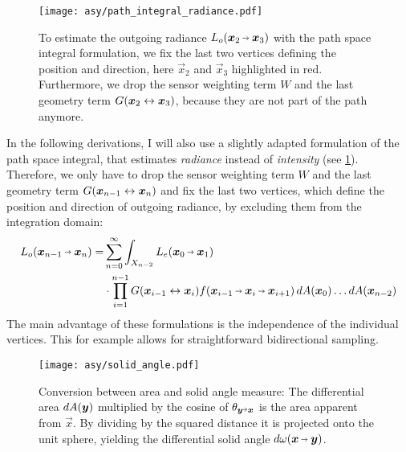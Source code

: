 \begin{figure}[htb!]
    \centering
    \texttt{[image: asy/path\_integral\_radiance.pdf]}
    \caption{To estimate the outgoing radiance $L_o(\pdir{2}{3})$ with the path space integral formulation, we fix the last two vertices defining the position and direction, here $\vec{x}_2$ and $\vec{x}_3$ highlighted in red. Furthermore, we drop the sensor weighting term $W$ and the last geometry term $G(\bm{x}_{2} \leftrightarrow \bm{x}_{3})$, because they are not part of the path anymore.}
    \label{fig:path_space_integral_radiance}
\end{figure}
In the following derivations, I will also use a slightly adapted formulation of the path space integral, that estimates \emph{radiance} instead of \emph{intensity} (see \cref{fig:path_space_integral_radiance}).
Therefore, we only have to drop the sensor weighting term $W$ and the last geometry term $G(\bm{x}_{n-1} \leftrightarrow \bm{x}_{n})$ and fix the last two vertices, which define the position and direction of outgoing radiance, by excluding them from the integration domain:
\begin{equation}
\label{eq:path_space_integral_radiance}
\begin{aligned}
    L_o(\pdir{n-1}{n})
    = &\sum_{n=0}^{\infty} \int_{X_{n-2}} L_e(\pdir{0}{1}) \\
    &\cdot \prod_{i=1}^{n - 1} \G{i-1}{i} \f{i-1}{i}{i+1} 
    \diff A(\vec{x}_0) \dots \diff A(\vec{x}_{n-2})
\end{aligned}
\end{equation}
The main advantage of these formulations is the independence of the individual vertices.
This for example allows for straightforward bidirectional sampling.

\begin{figure}[htb!]
    \centering
    \texttt{[image: asy/solid\_angle.pdf]}
    \caption{Conversion between area and solid angle measure: The differential area $\mathop{}\!d A(\bm{y})$ multiplied by the cosine of $\theta_{\vec{y}\veryshortarrow\vec{x}}$ is the area apparent from $\vec{x}$. By dividing by the squared distance it is projected onto the unit sphere, yielding the differential solid angle $\diff \omega(\vec{x}\pto\vec{y})$.}
    \label{fig:solid_angle}
\end{figure}

